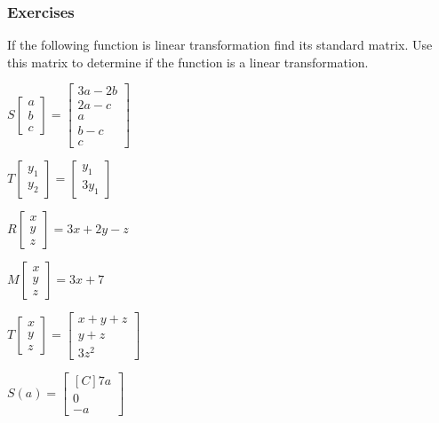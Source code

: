 \subsubsection{Exercises}

\begin{exercise} If the following function is linear transformation find its standard matrix. Use this matrix to determine if the function is a linear transformation.
\begin{inparaenum}[a)]
\item $S\begin{bmatrix}a\\b\\c\end{bmatrix}=\begin{bmatrix}3a-2b \\ 2a-c \\ a \\ b-c \\ c \end{bmatrix}$ \hfill
\item $T\begin{bmatrix} y_1 \\ y_2 \end{bmatrix} = \begin{bmatrix} y_1 \\ 3 y_1 \end{bmatrix}$ \hfill {} \\
\item $R\begin{bmatrix}x \\ y \\ z \end{bmatrix} = 3x+2y-z$ \hfill 
\item $M\begin{bmatrix}x \\ y \\ z \end{bmatrix} = 3x+7$ \hfill {} \\
\item $T\begin{bmatrix}x \\ y \\ z \end{bmatrix} = \begin{bmatrix} x+y+z \\ y+z \\ 3z^2 \end{bmatrix}$ \hfill 
\item $S(a)=\begin{bmatrix*}[C] 7a \\ 0 \\ -a \end{bmatrix*}$ \hfill {} \\

\end{inparaenum}
\end{exercise}
